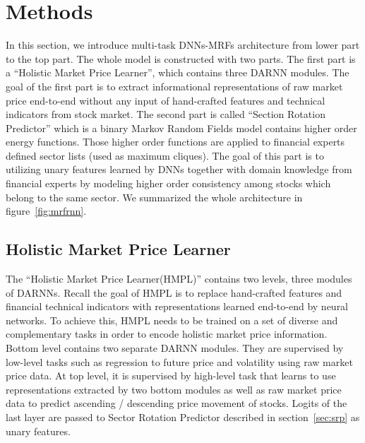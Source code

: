 \documentclass[sigconf]{acmart}
\renewcommand{\cite}{\citep}
\begin{document}
\section{Methods}
\label{sec:meth}

In this section, we introduce multi-task DNNs-MRFs architecture
from lower part to the top part. The whole model is constructed
with two parts. The first part is a ``Holistic Market Price
Learner'', which contains three DARNN modules. The goal of the
first part is to extract informational representations of raw
market price end-to-end without any input of hand-crafted
features and technical indicators from stock market. The second
part is called ``Section Rotation Predictor'' which is a binary
Markov Random Fields model contains higher order energy
functions. Those higher order functions are applied to financial
experts defined sector lists (used as maximum cliques). The goal
of this part is to utilizing unary features learned by DNNs
together with domain knowledge from financial experts by modeling
higher order consistency among stocks which belong to the same
sector. We summarized the whole architecture in
figure~\ref{fig:mrfrnn}.


\subsection{Holistic Market Price Learner}
\label{sec:hmpl}

The ``Holistic Market Price Learner(HMPL)'' contains two levels,
three modules of DARNNs\cite{qin2017dual}. Recall the goal of
HMPL is to replace hand-crafted features and financial technical
indicators with representations learned end-to-end by neural
networks. To achieve this, HMPL needs to be trained on a set of
diverse and complementary tasks in order to encode holistic
market price information. Bottom level contains two separate
DARNN modules. They are supervised by low-level tasks such as
regression to future price and volatility using raw market price
data. At top level, it is supervised by high-level task that
learns to use representations extracted by two bottom modules as
well as raw market price data to predict ascending / descending
price movement of stocks. Logits of the last layer are passed to
Sector Rotation Predictor described in section~\ref{sec:srp} as
unary features.
\end{document}
